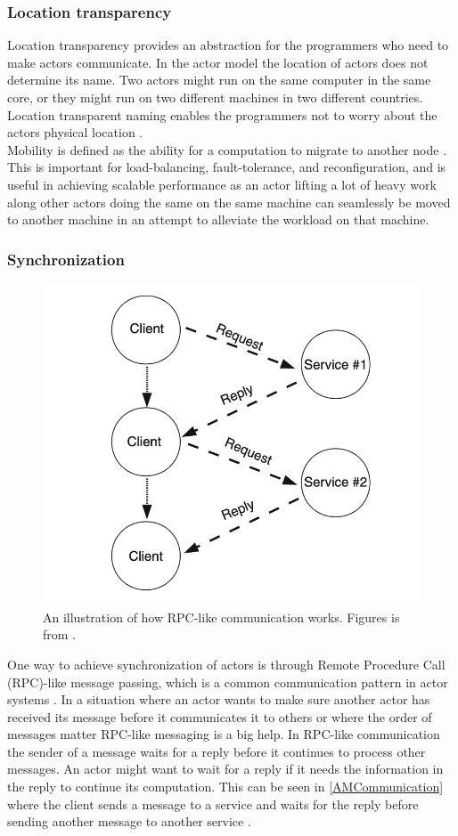 \subsubsection{Location transparency}
Location transparency provides an abstraction for the programmers who need to make actors communicate. In the actor model the location of actors does not determine its name. Two actors might run on the same computer in the same core, or they might run on two different machines in two different countries. Location transparent naming enables the programmers not to worry about the actors physical location \cite{ActorModelPaper}.\\
Mobility is defined as the ability for a computation to migrate to another node \cite{ActorModelPaper}. This is important for load-balancing, fault-tolerance, and reconfiguration, and is useful in achieving scalable performance \cite{ActorModelPaper} as an actor lifting a lot of heavy work along other actors doing the same on the same machine can seamlessly be moved to another machine in an attempt to alleviate the workload on that machine.

\subsubsection{Synchronization} \label{Synchronization}
\begin{figure}[H]
	\centering
	\includegraphics[width=0.6\linewidth]{Materials/ActorModel/AMCommunication}
	\caption{An illustration of how RPC-like communication works. Figures is from \cite{ActorModelPaper}.}
	\label{AMCommunication}
\end{figure}
One way to achieve synchronization of actors is through Remote Procedure Call (RPC)-like message passing, which is a common communication pattern in actor systems \cite{ActorModelPaper}. In a situation where an actor wants to make sure another actor has received its message before it communicates it to others or where the order of messages matter RPC-like messaging is a big help. In RPC-like communication the sender of a message waits for a reply before it continues to process other messages. An actor might want to wait for a reply if it needs the information in the reply to continue its computation. This can be seen in \autoref{AMCommunication} where the client sends a message to a service and waits for the reply before sending another message to another service \cite{ActorModelPaper}.\\

